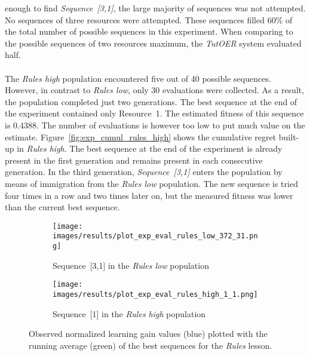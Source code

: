enough to find \emph{Sequence~[3,1]}, the large majority of sequences was not
attempted. No sequences of three resources were attempted. These sequences
filled 60\% of the total number of possible sequences in this experiment. When
comparing to the possible sequences of two resources maximum, the \emph{TutOER}
system evaluated half.\\\\
\noindent
The \emph{Rules high} population encountered five out of 40 possible sequences.
However, in contrast to \emph{Rules low}, only 30 evaluations were collected.
As a result, the population completed just two generations. The best sequence at the
end of the experiment contained only Resource~1. The estimated fitness of this
sequence is 0.4388. The number of evaluations is however too low to put much
value on the estimate. Figure~\ref{fig:exp_cumul_rules_high} shows the
cumulative regret built-up in \emph{Rules high}. The best sequence at the end of the experiment is
already present in the first generation and remains present in each consecutive
generation. In the third generation, \emph{Sequence~[3,1]} enters the population
by means of immigration from the \emph{Rules low} population. The new sequence
is tried four times in a row and two times later on, but the measured fitness
was lower than the current best sequence.

\begin{figure}[ht]
	\begin{subfigure}{0.9\linewidth}
	\centering
	\texttt{[image: images/results/plot\_exp\_eval\_rules\_low\_372\_31.png]}
	\caption{Sequence~[3,1] in the \emph{Rules low} population}
	\label{fig:exp_eval_rules_low_372}
	\end{subfigure}
	\hfill
	\begin{subfigure}{0.9\linewidth}
	\centering
	\texttt{[image: images/results/plot\_exp\_eval\_rules\_high\_1\_1.png]}
	\caption{Sequence~[1] in the \emph{Rules high} population}
	\label{fig:exp_eval_rules_high_1}
	\end{subfigure}
	\caption[Evaluations of best sequences in Rules]{Observed normalized learning gain values (blue) plotted with the
		running average (green) of the best sequences for the \emph{Rules}
	lesson.}
	\label{fig:exp_eval_rules}
\end{figure}

